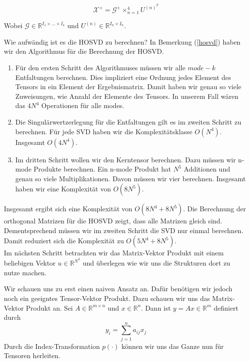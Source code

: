 \begin{equation} \label{eq:pinv}
\mathscr{X}^{+} = \mathscr{G}^{+} \times_{n=1}^{4} U^{ (n) ^{T} }
\end{equation}

Wobei $\mathscr{G} \in \mathbb{R}^{I_{1} \times \dots \times I_{4}}$ und $U^{(n)} \in \mathbb{R}^{I_{n} \times I_{n}}$.

Wie aufwändig ist es die HOSVD zu berechnen?
In Bemerkung (\ref{hosvd}) haben wir den Algorithmus für die Berechnung der HOSVD. 
\begin{enumerate}
\item Für den ersten Schritt des Algorithmuses müssen wir alle $mode-k$ Entfaltungen berechnen. Dies impliziert eine Ordnung jedes Element des Tensors in ein Element der Ergebnismatrix. Damit haben wir genau so viele Zuweisungen, wie Anzahl der Elemente des Tensors. In unserem Fall wären das $4N^4$ Operationen für alle modes. 

\item Die Singulärwertzerlegung für die Entfaltungen gilt es im zweiten Schritt zu berechnen. Für jede SVD haben wir die Komplexitätsklasse $O(N^4)$. Insgesamt $O(4N^4)$.

\item Im dritten Schritt wollen wir den Kerntensor berechnen. Dazu müssen wir n-mode Produkte berechnen. Ein n-mode Produkt hat  $N^5$ Additionen und genau so viele Multiplikationen. Davon müssen wir vier berechnen. Insgesamt haben wir eine Komplexität von $O(8N^5)$.

\end{enumerate}

Insgesamt ergibt sich eine Komplexität von $O(8N^4  + 8N^5)$. 
Die Berechnung der orthogonal Matrizen für die HOSVD zeigt, dass alle Matrizen gleich sind. Dementsprechend müssen wir im zweiten Schritt die SVD nur einmal berechnen. Damit reduziert sich die Komplexität zu $O(5N^4  + 8N^5)$. \\

Im nächsten Schritt betrachten wir das Matrix-Vektor Produkt mit einem beliebigen Vektor $u \in \mathbb{R}^{N^3}$ und überlegen wie wir uns die Strukturen dort zu nutze machen.

Wir schauen uns zu erst einen naiven Ansatz an. Dafür benötigen wir jedoch noch ein geeigntes Tensor-Vektor Produkt. 
Dazu schauen wir uns das Matrix-Vektor Produkt an. Sei $A \in \mathbb{R}^{m \times n}$ und $x \in \mathbb{R}^{n}$. Dann ist $y=Ax \in \mathbb{R}^{m}$ definiert durch
\begin{equation*}
y_i = \sum\limits_{j=1}^{n} a_{ij} x_j
\end{equation*}
Durch die Index-Transformation $p(\cdot)$ können wir uns das Ganze nun für Tensoren herleiten.


